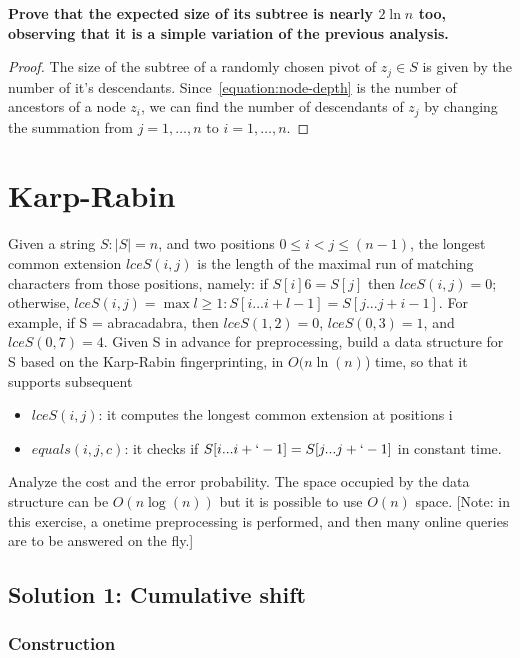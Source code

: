 \documentclass{article}
\begin{document}
\textbf{Prove that the expected size of its subtree is nearly $2 \ln n$ too,
observing that it is a simple variation of the previous analysis.}

\begin{proof}
  The size of the subtree of a randomly chosen pivot of $z_j\in S$ is given by
  the number of it's descendants. Since~\eqref{equation:node-depth} is the
  number of ancestors of a node $z_i$, we can find the number of descendants of
  $z_j$ by changing the summation from $j=1,\dotsc,n$ to $i=1,\dotsc,n$.
\end{proof}


\newpage
\section{Karp-Rabin}
Given a string $S: |S| = n$, and two positions $0 \leq i < j \leq (n - 1)$,
the longest common extension $lceS(i, j)$ is the length of the maximal run of matching
characters from those positions, namely: if $S[i] 6= S[j]$ then $lceS(i, j) = 0$;
otherwise, $lceS(i, j) = \max{l \geq 1 : S[i ... i + l - 1] = S[j ... j + i - 1]}$.
For example, if S = abracadabra, then $lceS(1, 2) = 0$, $lceS(0, 3) = 1$, and
$lceS(0, 7) = 4$.
Given S in advance for preprocessing, build a data structure for S based
on the Karp-Rabin fingerprinting, in $O(n \ln(n)$) time, so that it supports subsequent
    \begin{itemize}
    \item $lceS(i, j)$: it computes the longest common extension at positions i
    \item $equals (i, j, c)$: it checks if $S[i ... i + ` - 1] = S[j ... j + ` - 1]$ in constant time.
    \end{itemize}
Analyze the cost and the error probability.
The space occupied by the data structure can be $O(n \log(n))$ but it is possible
to use $O(n)$ space.
[Note: in this exercise, a onetime preprocessing is performed, and then many online
queries are to be answered on the fly.]

\subsection{Solution 1: Cumulative shift}
\subsubsection{Construction}
\end{document}
